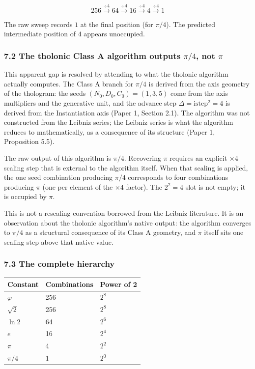 \documentclass[
  11pt,
  letterpaper,
]{article}
\begin{document}
\[
256 \xrightarrow{\div 4} 64 \xrightarrow{\div 4} 16 \xrightarrow{\div 4} 4 \xrightarrow{\div 4} 1
\]

The raw sweep records \(1\) at the final position (for \(\pi/4\)). The
predicted intermediate position of \(4\) appears unoccupied.

\subsubsection{\texorpdfstring{7.2 The tholonic Class A algorithm
outputs \(\pi/4\), not
\(\pi\)}{7.2 The tholonic Class A algorithm outputs \textbackslash pi/4, not \textbackslash pi}}\label{the-tholonic-class-a-algorithm-outputs-pi4-not-pi}

This apparent gap is resolved by attending to what the tholonic
algorithm actually computes. The Class A branch for \(\pi/4\) is derived
from the axis geometry of the thologram: the seeds
\((N_0, D_0, C_0) = (1, 3, 5)\) come from the axis multipliers and the
generative unit, and the advance step \(\Delta = \mathrm{istep}^2 = 4\)
is derived from the Instantiation axis (Paper 1, Section 2.1). The
algorithm was not constructed from the Leibniz series; the Leibniz
series is what the algorithm reduces to mathematically, as a consequence
of its structure (Paper 1, Proposition 5.5).

The raw output of this algorithm is \(\pi/4\). Recovering \(\pi\)
requires an explicit \(\times 4\) scaling step that is external to the
algorithm itself. When that scaling is applied, the one seed combination
producing \(\pi/4\) corresponds to four combinations producing \(\pi\)
(one per element of the \(\times 4\) factor). The \(2^2 = 4\) slot is
not empty; it is occupied by \(\pi\).

This is not a rescaling convention borrowed from the Leibniz literature.
It is an observation about the tholonic algorithm's native output: the
algorithm converges to \(\pi/4\) as a structural consequence of its
Class A geometry, and \(\pi\) itself sits one scaling step above that
native value.

\subsubsection{7.3 The complete hierarchy}\label{the-complete-hierarchy}

\begin{longtable}[]{@{}lll@{}}
\toprule\noalign{}
Constant & Combinations & Power of 2 \\
\midrule\noalign{}
\endhead
\bottomrule\noalign{}
\endlastfoot
\(\varphi\) & 256 & \(2^8\) \\
\(\sqrt{2}\) & 256 & \(2^8\) \\
\(\ln 2\) & 64 & \(2^6\) \\
\(e\) & 16 & \(2^4\) \\
\(\pi\) & 4 & \(2^2\) \\
\(\pi/4\) & 1 & \(2^0\) \\
\end{longtable}
\end{document}
